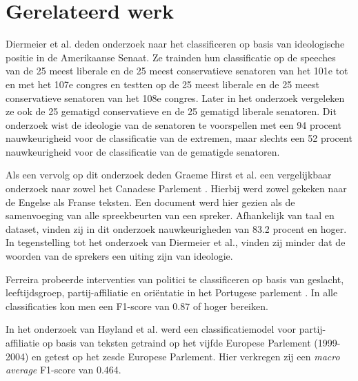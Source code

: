 \section{Gerelateerd werk}
\label{sec:rel}

Diermeier et al. deden onderzoek naar het classificeren op basis van ideologische positie in de Amerikaanse Senaat\cite{diermeier_godbout_yu_kaufmann_2012}. Ze trainden hun classificatie op de speeches van de 25 meest liberale en de 25 meest conservatieve senatoren van het 101e tot en met het 107e congres en testten op de 25 meest liberale en de 25 meest conservatieve senatoren van het 108e congres. Later in het onderzoek vergeleken ze ook de 25 gematigd conservatieve  en de 25 gematigd liberale senatoren.  Dit onderzoek wist de ideologie van de senatoren te voorspellen met een 94 procent nauwkeurigheid voor de classificatie van de extremen, maar slechts een 52 procent nauwkeurigheid voor de classificatie van de gematigde senatoren.\par

Als een vervolg op dit onderzoek deden Graeme Hirst et al. een vergelijkbaar onderzoek naar zowel het Canadese Parlement \cite{Hirst_textto}. Hierbij werd zowel gekeken naar de Engelse als Franse teksten. Een document werd hier gezien als de samenvoeging van alle spreekbeurten van een spreker. Afhankelijk van taal en dataset, vinden zij in dit onderzoek nauwkeurigheden van 83.2 procent en hoger. In tegenstelling tot het onderzoek van Diermeier et al., vinden zij minder dat de woorden van de sprekers een uiting zijn van ideologie. \par

Ferreira probeerde interventies van politici te classificeren op basis van geslacht, leeftijdsgroep, partij-affiliatie en ori\"{e}ntatie in het Portugese parlement \cite{Ferreira2016UsingTT}. In alle classificaties kon men een F1-score van 0.87 of hoger bereiken.\par
In het onderzoek van Høyland et al. werd een classificatiemodel voor partij-affiliatie op basis van teksten getraind op het vijfde Europese Parlement (1999-2004) en getest op het zesde Europese Parlement\cite{W14-2516}. Hier verkregen zij een \textit{macro average} F1-score van 0.464.\par

